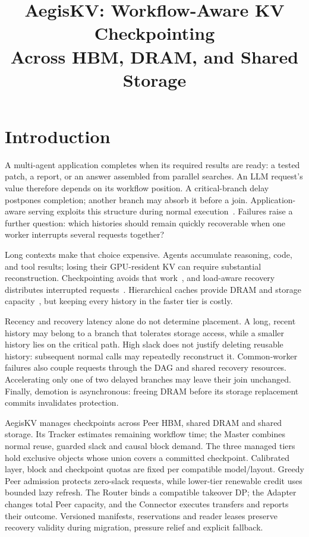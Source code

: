 \documentclass[sigplan,10pt,anonymous,nonacm]{acmart}
\title{AegisKV: Workflow-Aware KV Checkpointing\texorpdfstring{\\}{ }Across HBM, DRAM, and Shared Storage}
\begin{document}
\pagestyle{aegispreview}

\maketitle
\thispagestyle{aegispreview}
\raggedbottom

\section{Introduction}
\label{sec:introduction}

A multi-agent application completes when its required results are ready:
a tested patch, a report, or an answer assembled from parallel searches.
An LLM request's value therefore depends on its workflow position. A
critical-branch delay postpones completion; another branch may absorb it
before a join. Application-aware serving exploits this structure during
normal execution~\cite{lin2024parrot,pan2025kvflow,ni2026topas}. Failures
raise a further question: which histories should remain quickly
recoverable when one worker interrupts several requests together?

Long contexts make that choice expensive. Agents accumulate reasoning,
code, and tool results; losing their GPU-resident KV can require substantial
reconstruction. Checkpointing avoids that work~\cite{strati2024dejavu,jayakody2026ghostserve},
and load-aware recovery distributes interrupted requests~\cite{cao2026lumen}.
Hierarchical caches provide DRAM and storage capacity~\cite{qin2025mooncake,xie2026strata},
but keeping every history in the faster tier is costly.

Recency and recovery latency alone do not determine placement. A long,
recent history may belong to a branch that tolerates storage access,
while a smaller history lies on the critical path. High slack does not
justify deleting reusable history: subsequent normal calls may repeatedly
reconstruct it. Common-worker failures also couple requests through the
DAG and shared recovery resources. Accelerating only one of two delayed
branches may leave their join unchanged. Finally, demotion is asynchronous:
freeing DRAM before its storage replacement commits invalidates protection.

AegisKV manages checkpoints across Peer HBM, shared DRAM and shared storage.
Its Tracker estimates remaining workflow time; the Master combines
normal reuse, guarded slack and causal block demand. The three managed
tiers hold exclusive objects whose union covers a committed checkpoint.
Calibrated layer, block and checkpoint quotas are fixed per compatible
model/layout. Greedy Peer admission protects zero-slack requests, while
lower-tier renewable credit uses bounded lazy refresh. The Router binds
a compatible takeover DP; the Adapter changes total Peer capacity, and
the Connector executes transfers and reports their outcome. Versioned
manifests, reservations and reader leases preserve recovery validity
during migration, pressure relief and explicit fallback.
\end{document}
